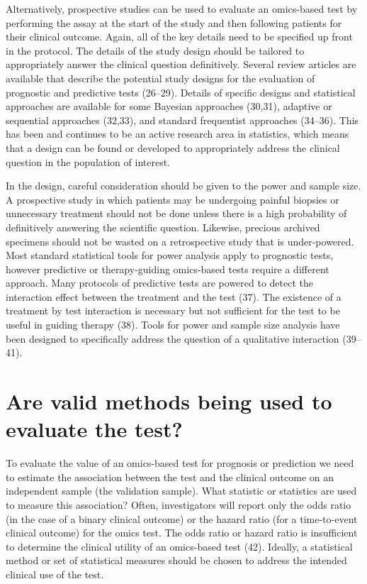 \documentclass[11pt]{article}
\begin{document}
Alternatively, prospective studies can be used to evaluate an
omics-based test by performing the assay at the start of the study and
then following patients for their clinical outcome. Again, all of the
key details need to be specified up front in the protocol. The details
of the study design should be tailored to appropriately answer the
clinical question definitively. Several review articles are available
that describe the potential study designs for the evaluation of
prognostic and predictive tests (26--29). Details of specific designs
and statistical approaches are available for some Bayesian approaches
(30,31), adaptive or sequential approaches (32,33), and standard
frequentist approaches (34--36). This has been and continues to be an
active research area in statistics, which means that a design can be
found or developed to appropriately address the clinical question in the
population of interest.

In the design, careful consideration should be given to the power and
sample size. A prospective study in which patients may be undergoing
painful biopsies or unnecessary treatment should not be done unless
there is a high probability of definitively answering the scientific
question. Likewise, precious archived specimens should not be wasted on
a retrospective study that is under-powered. Most standard statistical
tools for power analysis apply to prognostic tests, however predictive
or therapy-guiding omics-based tests require a different approach. Many
protocols of predictive tests are powered to detect the interaction
effect between the treatment and the test (37). The existence of a
treatment by test interaction is necessary but not sufficient for the
test to be useful in guiding therapy (38). Tools for power and sample
size analysis have been designed to specifically address the question of
a qualitative interaction (39--41).

\section{Are valid methods being used to evaluate the
test?}\label{are-valid-methods-being-used-to-evaluate-the-test}

To evaluate the value of an omics-based test for prognosis or prediction
we need to estimate the association between the test and the clinical
outcome on an independent sample (the validation sample). What statistic
or statistics are used to measure this association? Often, investigators
will report only the odds ratio (in the case of a binary clinical
outcome) or the hazard ratio (for a time-to-event clinical outcome) for
the omics test. The odds ratio or hazard ratio is insufficient to
determine the clinical utility of an omics-based test (42). Ideally, a
statistical method or set of statistical measures should be chosen to
address the intended clinical use of the test.
\end{document}
